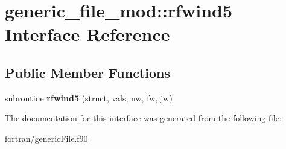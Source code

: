 \hypertarget{interfacegeneric__file__mod_1_1rfwind5}{}\section{generic\+\_\+file\+\_\+mod\+:\+:rfwind5 Interface Reference}
\label{interfacegeneric__file__mod_1_1rfwind5}
\subsection*{Public Member Functions}
\begin{DoxyCompactItemize}
\item 
\mbox{\label{interfacegeneric__file__mod_1_1rfwind5_a46dbd9baaf1c75f67071ded7cbb656c9}} 
subroutine {\bfseries rfwind5} (struct, vals, nw, fw, jw)
\end{DoxyCompactItemize}


The documentation for this interface was generated from the following file\+:\begin{DoxyCompactItemize}
\item 
fortran/generic\+File.\+f90\end{DoxyCompactItemize}
